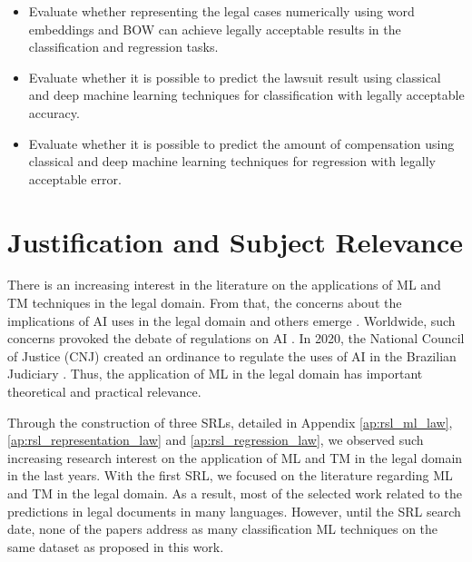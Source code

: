 \begin{itemize}[noitemsep]
    \item Evaluate whether representing the legal cases numerically using word embeddings and BOW can achieve legally acceptable results in the classification and regression tasks.
    \item Evaluate whether it is possible to predict the lawsuit result using classical and deep machine learning techniques for classification with legally acceptable accuracy.
    \item Evaluate whether it is possible to predict the amount of compensation  using classical and deep machine learning  techniques for regression with legally acceptable error.
\end{itemize}

\section{Justification and Subject Relevance}

There is an increasing interest in the literature on the applications of ML and TM techniques in the legal domain. From that, the concerns about the implications of AI uses in the legal domain and others emerge \cite{Braz2018a, Davis2020}. Worldwide, such concerns provoked the debate of regulations on AI \cite{Cath2018}. In 2020, the National Council of Justice (CNJ) created an ordinance to regulate the uses of AI in the Brazilian Judiciary \cite{CNJ2020b}. Thus, the application of ML in the legal domain has important theoretical and practical relevance.

Through the construction of three SRLs, detailed in Appendix \ref{ap:rsl_ml_law}, \ref{ap:rsl_representation_law} and \ref{ap:rsl_regression_law}, we observed such increasing research interest on the application of ML and TM in the legal domain in the last years. With the first SRL, we focused on the literature regarding ML and TM in the legal domain. As a result, most of the selected work related to the predictions in legal documents in many languages. However, until the SRL search date, none of the papers address as many classification ML techniques on the same dataset as proposed in this work. 


